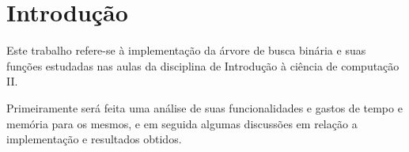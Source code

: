 \chapter{Introdução}
\label{cap:introducao}
Este trabalho refere-se à implementação da árvore de busca binária e suas funções estudadas nas aulas da disciplina de Introdução à ciência de computação II.

Primeiramente será feita uma análise de suas funcionalidades e gastos de tempo e memória para os mesmos, e em seguida algumas discussões em relação a implementação e resultados obtidos.

